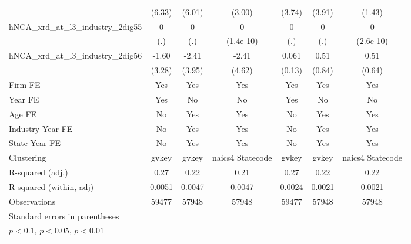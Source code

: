 {\begin{tabular}{l*{6}{c}}
                    &      (6.33)         &      (6.01)         &      (3.00)         &      (3.74)         &      (3.91)         &      (1.43)         \\
\addlinespace
hNCA\_xrd\_at\_l3\_industry\_2dig55&           0         &           0         &           0         &           0         &           0         &           0         \\
                    &         (.)         &         (.)         &   (1.4e-10)         &         (.)         &         (.)         &   (2.6e-10)         \\
\addlinespace
hNCA\_xrd\_at\_l3\_industry\_2dig56&       -1.60         &       -2.41         &       -2.41         &       0.061         &        0.51         &        0.51         \\
                    &      (3.28)         &      (3.95)         &      (4.62)         &      (0.13)         &      (0.84)         &      (0.64)         \\
\addlinespace
Firm FE             &         Yes         &         Yes         &         Yes         &         Yes         &         Yes         &         Yes         \\
\addlinespace
Year FE             &         Yes         &          No         &          No         &         Yes         &          No         &          No         \\
\addlinespace
Age FE              &          No         &         Yes         &         Yes         &          No         &         Yes         &         Yes         \\
\addlinespace
Industry-Year FE    &          No         &         Yes         &         Yes         &          No         &         Yes         &         Yes         \\
\addlinespace
State-Year FE       &          No         &         Yes         &         Yes         &          No         &         Yes         &         Yes         \\
\midrule
Clustering          &       gvkey         &       gvkey         &naics4 Statecode         &       gvkey         &       gvkey         &naics4 Statecode         \\
R-squared (adj.)    &        0.27         &        0.22         &        0.21         &        0.27         &        0.22         &        0.22         \\
R-squared (within, adj)&      0.0051         &      0.0047         &      0.0047         &      0.0024         &      0.0021         &      0.0021         \\
Observations        &       59477         &       57948         &       57948         &       59477         &       57948         &       57948         \\
\bottomrule
\multicolumn{7}{l}{\footnotesize Standard errors in parentheses}\\
\multicolumn{7}{l}{\footnotesize \sym{*} \(p<0.1\), \sym{**} \(p<0.05\), \sym{***} \(p<0.01\)}\\
\end{tabular}
}
